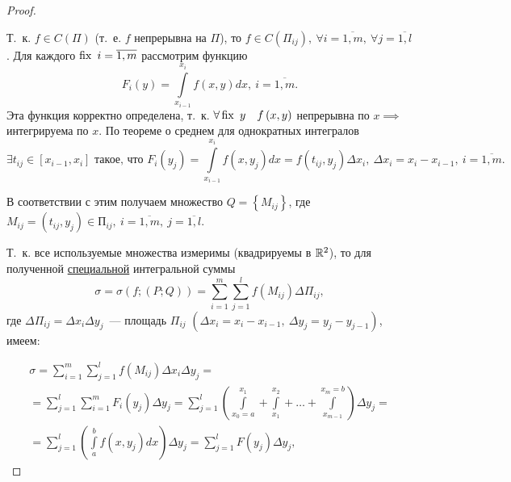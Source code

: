 \documentclass[../../main.tex]{subfiles}
\begin{document}
\begin{proof}
\begin{center}
	\end{center}
 
 	Т.~к. $ f \in C(\Pi)$ (т.~е. $f$ непрерывна на 
 	$\Pi$), то $ f \in C( \Pi_{ij} ),\ 
 	\forall i = \overline{1, m},\ \forall j = \overline{1, l}$. Для каждого 
 	$\operatorname{fix}\ i = \overline{1, m} $ рассмотрим функцию \[F_i \left( y \right) = 
 	\int\limits_{ x_{i - 1} } ^ {x_i} f \left( x, y \right) dx,\  
 	i = \overline{1, m}.\]
 	Эта функция корректно определена, 
 	т.~к. $ \forall \fix\ y\quad f \left( x, y\right) $
 	непрерывна по $x \implies$ интегрируема по $x$. По теореме о среднем
 	для однократных интегралов \[\exists t_{ij} \in 
 	\left[ x_{i - 1}, x_i \right] \text{ такое, что } F_i \left( y_j \right) = 
 	\int\limits_{x_{i - 1} } ^ {x_i} f \left( x, y_j \right) dx = 
 	f \left(  t_{ij}, y_j \right) \Delta x_i,\ 
    \Delta x_i = x_i - x_{i - 1},\ 
 	i = \overline{1, m}.\]
 	
 	В соответствии с этим получаем множество 
 	$Q = \left\lbrace M_{ij} \right\rbrace$,
 	где $ M_{ij} = \left( t_{ij}, y_j \right) \in \text{П}_{ij},\  
 	i = \overline{1, m},\  
 	j = \overline{1, l}$.
 	
 	Т.~к. все используемые множества измеримы (квадрируемы в $ \mathbb{R}^2 $), 
 	то для полученной \underline{специальной} интегральной суммы
 	\begin{equation}
 	\label{lec_13, num_14}
 	\sigma = \sigma \left( f; \left( P; Q \right) \right) = 
 	\sum\limits_{i = 1}^m 
 	\sum\limits_{j = 1}^l f \left( M_{ij} \right) \Delta \Pi_{ij},
 	\end{equation}
 	где $\Delta \Pi_{ij} = \Delta x_i \Delta y_j$~---  
 	площадь $\Pi_{ij}$ 
 	$(\Delta x_i = x_i - x_{i-1},\ \Delta y_j = y_j - y_{j - 1})$,
 	имеем:
 	
 	\begin{equation}
 	\begin{gathered}
 	\sigma = \sum\limits_{i = 1}^m 
 	\sum\limits_{j = 1}^l f \left( M_{ij} \right) \Delta x_i \Delta y_j = \\
 	= \sum\limits_{j = 1}^l 
 	\sum\limits_{i = 1}^m F_i \left( y_j \right) \Delta y_j = 
 	\sum\limits_{j = 1}^l \left( 
 	\int\limits_{x_0 = a}^{ x_1 } + \int\limits_{x_1}^{ x_2 } + \dots + 
 	\int\limits_{ x_{m-1} }^{x_m = b} \right) \Delta y_j = \\
 	= \sum\limits_{j = 1}^l \left( \int\limits_a^b f 
 	\left( x, y_j\right) dx \right) \Delta y_j 
 	\label{lec_13, num_15}
 	= \sum\limits_{j = 1}^l F \left( y_j \right) \Delta y_j,
 	\end{gathered}
 	\end{equation}
 	

\end{proof}
\end{document}

